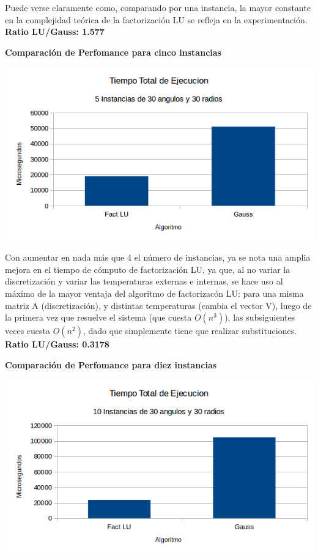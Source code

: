 Puede verse claramente como, comparando por una instancia, la mayor constante en la complejidad te\'orica de la factorizaci\'on LU se refleja en la experimentaci\'on. \textbf{Ratio LU/Gauss: 1.577}

 \textbf{Comparaci\'on de Perfomance para cinco instancias}\\
\begin{center}
\includegraphics[scale=0.7]{experimentos2a_2b/2bCincoInstancias.png}
\end{center}

Con aumentar en nada m\'as que 4 el n\'umero de instancias, ya se nota una amplia mejora en el tiempo de c\'omputo de factorizaci\'on LU, ya que, al no variar la discretizaci\'on y variar las temperaturas externas e internas, se hace uso al m\'aximo de la mayor ventaja del algoritmo de factorizac\'on LU: para una misma matriz A (discretizaci\'on), y distintas temperaturas (cambia el vector V), luego de la primera vez que resuelve el sistema (que cuesta $O(n^3)$), las subsiguientes veces cuesta $O(n^2)$, dado que simplemente tiene que realizar substituciones. \textbf{Ratio LU/Gauss: 0.3178}

 \textbf{Comparaci\'on de Perfomance para diez instancias}\\
\begin{center}
\includegraphics[scale=0.7]{experimentos2a_2b/2bDiezInstancias.png}
\end{center}

